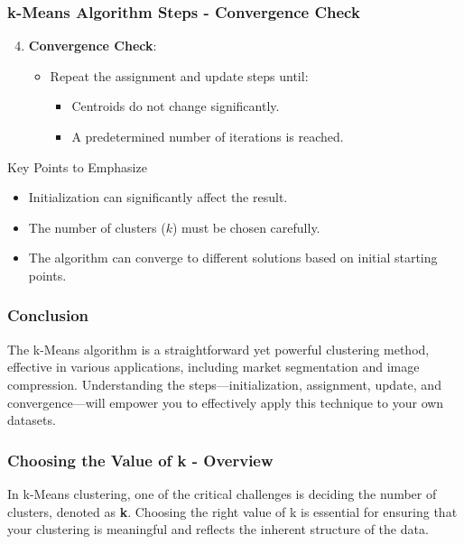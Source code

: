 \documentclass[aspectratio=169]{beamer}
\begin{document}
\begin{frame}[fragile]
    \frametitle{k-Means Algorithm Steps - Convergence Check}
    \begin{enumerate}
        \setcounter{enumi}{3}
        \item \textbf{Convergence Check}:
        \begin{itemize}
            \item Repeat the assignment and update steps until:
            \begin{itemize}
                \item Centroids do not change significantly.
                \item A predetermined number of iterations is reached.
            \end{itemize}
        \end{itemize}
    \end{enumerate}

    \begin{block}{Key Points to Emphasize}
        \begin{itemize}
            \item Initialization can significantly affect the result. 
            \item The number of clusters (\( k \)) must be chosen carefully.
            \item The algorithm can converge to different solutions based on initial starting points.
        \end{itemize}
    \end{block}
\end{frame}

\begin{frame}[fragile]
    \frametitle{Conclusion}
    The k-Means algorithm is a straightforward yet powerful clustering method, effective in various applications, including market segmentation and image compression. Understanding the steps—initialization, assignment, update, and convergence—will empower you to effectively apply this technique to your own datasets.
\end{frame}

\begin{frame}[fragile]
  \frametitle{Choosing the Value of k - Overview}
  In k-Means clustering, one of the critical challenges is deciding the number of clusters, denoted as \textbf{k}. Choosing the right value of k is essential for ensuring that your clustering is meaningful and reflects the inherent structure of the data.
\end{frame}
\end{document}
